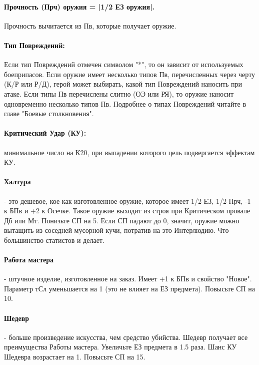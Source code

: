 \paragraph{Прочность (Прч) оружия = |1/2 ЕЗ оружия|.} Прочность вычитается из Пв, которые получает оружие.

\paragraph{Тип Повреждений:} 
\newline Если тип Повреждений отмечен символом "*", то он зависит от используемых боеприпасов.
\newline Если оружие имеет несколько типов Пв, перечисленных через черту (К/Р или Р/Д), герой может выбирать, какой тип Повреждений наносить при атаке. 
\newline Если типы Пв перечислены слитно (ОЭ или РЯ), то оружие наносит одновременно несколько типов Пв. 
\newline Подробнее о типах Повреждений читайте в главе "Боевые столкновения".

\paragraph{Критический Удар (КУ):} минимальное число на К20, при выпадении которого цель подвергается эффектам КУ. 

\paragraph{Халтура} - это дешевое, кое-как изготовленное оружие, которое имеет 1/2 ЕЗ, 1/2 Прч, -1 к БПв и +2 к Осечке. Такое оружие выходит из строя при Критическом провале Дб или Мт. Понизьте СП на 5. Если СП падают до 0, значит, оружие можно вытащить из соседней мусорной кучи, потратив на это Интерлюдию. Что большинство статистов и делает.
\paragraph{Работа мастера} - штучное изделие, изготовленное на заказ. Имеет +1 к БПв и свойство "Новое". Параметр тСл уменьшается на 1 (это не влияет на ЕЗ предмета). Повысьте СП на 10. 
\paragraph{Шедевр} - больше произведение искусства, чем средство убийства.  Шедевр получает все преимущества Работы мастера. Увеличьте ЕЗ предмета в 1.5 раза. Шанс КУ Шедевра возрастает на 1. Повысьте СП на 15.

